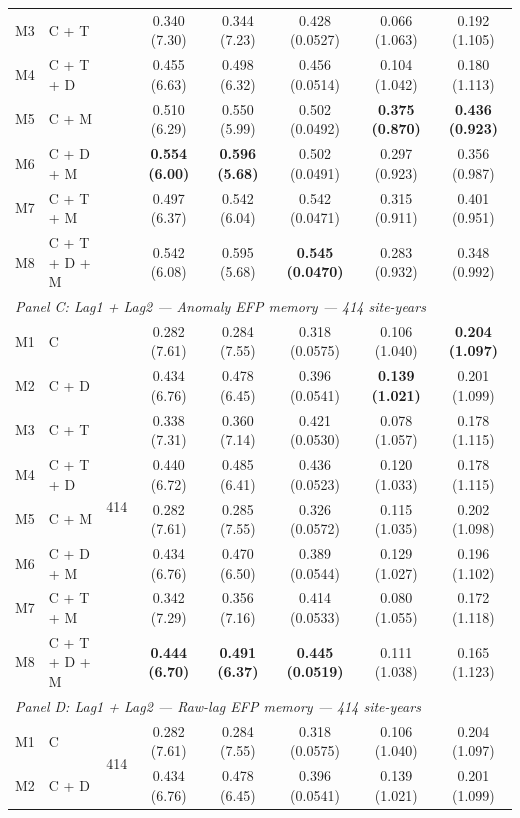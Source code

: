 \begin{table}[htbp]
\begin{tabular}{llcccccc}
M3 & C + T &  & 0.340 (7.30) & 0.344 (7.23) & 0.428 (0.0527) & 0.066 (1.063) & 0.192 (1.105) \\
M4 & C + T + D &  & 0.455 (6.63) & 0.498 (6.32) & 0.456 (0.0514) & 0.104 (1.042) & 0.180 (1.113) \\
M5 & C + M &  & 0.510 (6.29) & 0.550 (5.99) & 0.502 (0.0492) & \textbf{0.375 (0.870)} & \textbf{0.436 (0.923)} \\
M6 & C + D + M &  & \textbf{0.554 (6.00)} & \textbf{0.596 (5.68)} & 0.502 (0.0491) & 0.297 (0.923) & 0.356 (0.987) \\
M7 & C + T + M &  & 0.497 (6.37) & 0.542 (6.04) & 0.542 (0.0471) & 0.315 (0.911) & 0.401 (0.951) \\
M8 & C + T + D + M &  & 0.542 (6.08) & 0.595 (5.68) & \textbf{0.545 (0.0470)} & 0.283 (0.932) & 0.348 (0.992) \\
\midrule
\multicolumn{8}{l}{\textit{Panel C: Lag1 + Lag2 --- Anomaly EFP memory --- 414 site-years}} \\
\midrule
M1 & C & \multirow{8}{*}{414} & 0.282 (7.61) & 0.284 (7.55) & 0.318 (0.0575) & 0.106 (1.040) & \textbf{0.204 (1.097)} \\
M2 & C + D &  & 0.434 (6.76) & 0.478 (6.45) & 0.396 (0.0541) & \textbf{0.139 (1.021)} & 0.201 (1.099) \\
M3 & C + T &  & 0.338 (7.31) & 0.360 (7.14) & 0.421 (0.0530) & 0.078 (1.057) & 0.178 (1.115) \\
M4 & C + T + D &  & 0.440 (6.72) & 0.485 (6.41) & 0.436 (0.0523) & 0.120 (1.033) & 0.178 (1.115) \\
M5 & C + M &  & 0.282 (7.61) & 0.285 (7.55) & 0.326 (0.0572) & 0.115 (1.035) & 0.202 (1.098) \\
M6 & C + D + M &  & 0.434 (6.76) & 0.470 (6.50) & 0.389 (0.0544) & 0.129 (1.027) & 0.196 (1.102) \\
M7 & C + T + M &  & 0.342 (7.29) & 0.356 (7.16) & 0.414 (0.0533) & 0.080 (1.055) & 0.172 (1.118) \\
M8 & C + T + D + M &  & \textbf{0.444 (6.70)} & \textbf{0.491 (6.37)} & \textbf{0.445 (0.0519)} & 0.111 (1.038) & 0.165 (1.123) \\
\midrule
\multicolumn{8}{l}{\textit{Panel D: Lag1 + Lag2 --- Raw-lag EFP memory --- 414 site-years}} \\
\midrule
M1 & C & \multirow{8}{*}{414} & 0.282 (7.61) & 0.284 (7.55) & 0.318 (0.0575) & 0.106 (1.040) & 0.204 (1.097) \\
M2 & C + D &  & 0.434 (6.76) & 0.478 (6.45) & 0.396 (0.0541) & 0.139 (1.021) & 0.201 (1.099) \\

\end{tabular}
\end{table}
